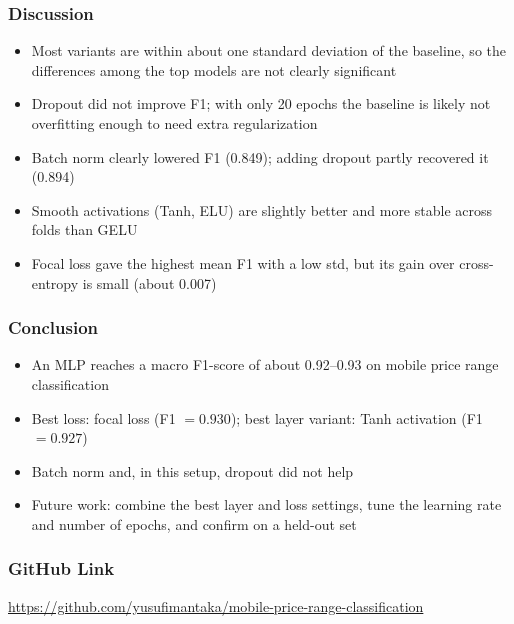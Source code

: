 \documentclass{beamer}
\begin{document}
\begin{frame}
    \frametitle{Discussion}
    \begin{itemize}
        \item Most variants are within about one standard deviation of the baseline, so the differences among the top models are not clearly significant
        \item Dropout did not improve F1; with only 20 epochs the baseline is likely not overfitting enough to need extra regularization
        \item Batch norm clearly lowered F1 (0.849); adding dropout partly recovered it (0.894)
        \item Smooth activations (Tanh, ELU) are slightly better and more stable across folds than GELU
        \item Focal loss gave the highest mean F1 with a low std, but its gain over cross-entropy is small (about 0.007)
    \end{itemize}
\end{frame}

\begin{frame}
    \frametitle{Conclusion}
    \begin{itemize}
        \item An MLP reaches a macro F1-score of about 0.92--0.93 on mobile price range classification
        \item Best loss: focal loss (F1 $= 0.930$); best layer variant: Tanh activation (F1 $= 0.927$)
        \item Batch norm and, in this setup, dropout did not help
        \item Future work: combine the best layer and loss settings, tune the learning rate and number of epochs, and confirm on a held-out set
    \end{itemize}
\end{frame}

\begin{frame}
    \frametitle{GitHub Link}
    \url{https://github.com/yusufimantaka/mobile-price-range-classification}
\end{frame}
\end{document}
